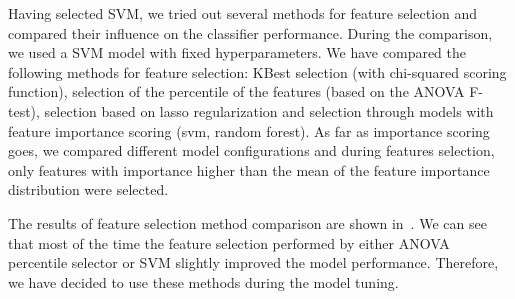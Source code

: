 Having selected SVM, we tried out several methods for feature
selection and compared their influence on the classifier performance. During the comparison,
we used a SVM model with fixed hyperparameters. We have compared the following methods for
feature selection: KBest selection (with chi-squared scoring function), selection of the percentile
of the features (based on the ANOVA F-test),
selection based on lasso regularization and selection through models with feature importance
scoring (svm, random forest). As far as importance scoring goes, we compared different
model configurations and during features selection, only features with importance higher
than the mean of the feature importance distribution were selected.

The results of feature selection method comparison are shown in~. We can see
that most of the time the feature selection performed by either ANOVA percentile selector or
SVM slightly improved the model performance. Therefore, we have decided to use these methods during
the model tuning.

